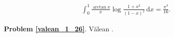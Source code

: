 %

\begin{problem_with_solution}
    \label{valean_1_26}%
    \begin{align}
        \int_0^1 \frac{\arctan x}{x} \log \frac{1+x^2}{(1-x)^2} \,\mathrm{d}x = \frac{\pi^3}{16}.
    \end{align} 
\end{problem_with_solution}



\textbf{Problem \ref{valean_1_26}}.
Vălean \cite[s. 17]{nahin15}.


%